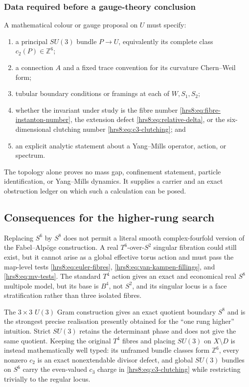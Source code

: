 \subsubsection{Data required before a gauge-theory conclusion}
\label{hrs8:subsubsec:gauge-data}

A mathematical colour or gauge proposal on $U$ must specify:
\begin{enumerate}
 \item a principal $SU(3)$ bundle $P\to U$, equivalently its complete class
       $c_2(P)\in\mathbb Z^6$;
 \item a connection $A$ and a fixed trace convention for its curvature
       Chern--Weil form;
 \item tubular boundary conditions or framings at each of $W,S_1,S_2$;
 \item whether the invariant under study is the fibre number
       \eqref{hrs8:eq:fibre-instanton-number}, the extension defect
       \eqref{hrs8:eq:relative-delta}, or the six-dimensional clutching
       number \eqref{hrs8:eq:c3-clutching}; and
 \item an explicit analytic statement about a Yang--Mills operator, action,
       or spectrum.
\end{enumerate}
The topology alone proves no mass gap, confinement statement, particle
identification, or Yang--Mills dynamics.  It supplies a carrier and an exact
obstruction ledger on which such a calculation can be posed.

\subsection{Consequences for the higher-rung search}
\label{hrs8:subsec:consequences}

Replacing $S^6$ by $S^8$ does not permit a literal smooth complex-fourfold
version of the Fabel--Alp\"oge construction.  A real $T^6$-over-$S^2$
singular fibration could still exist, but it cannot arise as a global
effective torus action and must pass the map-level tests
\eqref{hrs8:eq:euler-fibres}, \eqref{hrs8:eq:van-kampen-fillings}, and
\eqref{hrs8:eq:mv-tests}.  The standard $T^4$ action gives an exact and
economical real $S^8$ multipole model, but its base is $B^4$, not $S^2$, and
its singular locus is a face stratification rather than three isolated
fibres.

The $3\times3$ $U(3)$ Gram construction gives an exact quotient boundary
$S^8$ and is the strongest precise realisation presently obtained for the
``one rung higher'' intuition.  Strict $SU(3)$ retains the determinant phase
and does not give the same quotient.  Keeping the original $T^4$ fibres and
placing $SU(3)$ on $X\setminus D$ is instead mathematically well typed: its
unframed bundle classes form $\mathbb Z^6$, every nonzero $c_2$ is an exact
nonextendable divisor defect, and global $SU(3)$ bundles on $S^6$ carry the
even-valued $c_3$ charge in \eqref{hrs8:eq:c3-clutching} while restricting
trivially to the regular locus.


